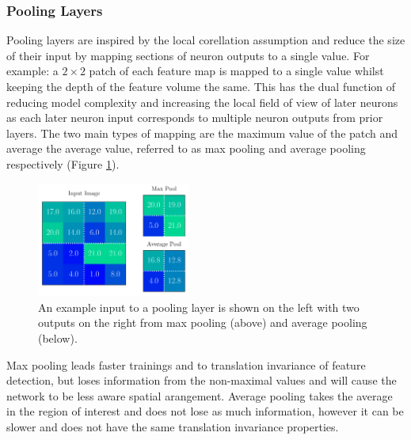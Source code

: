 \subsubsection{Pooling Layers}
Pooling layers are inspired by the local corellation assumption and reduce the size of their input by mapping sections of neuron outputs to a single value. For example: a $2\times{}2$ patch of each feature map is mapped to a single value whilst keeping the depth of the feature volume the same.
This has the dual function of reducing model complexity and increasing the local field of view of later neurons as each later neuron input corresponds to multiple neuron outputs from prior layers. 
The two main types of mapping are the maximum value of the patch and average the average value, referred to as max pooling and average pooling respectively (Figure \ref{fig:machine_learning:pooling}). 
\begin{figure}[h!]
    \centering
    \includegraphics[width=0.45\textwidth]{figures/machine_learning/pooling.pdf}
    \caption{An example input to a pooling layer is shown on the left with two outputs on the right from max pooling (above) and average pooling (below).}
        \label{fig:machine_learning:pooling}
\end{figure}

Max pooling leads faster trainings and to translation invariance of feature detection, but loses information from the non-maximal values and will cause the network to be less aware spatial arangement.  
Average pooling takes the average in the region of interest and does not lose as much information, however it can be slower and does not have the same translation invariance properties. 


